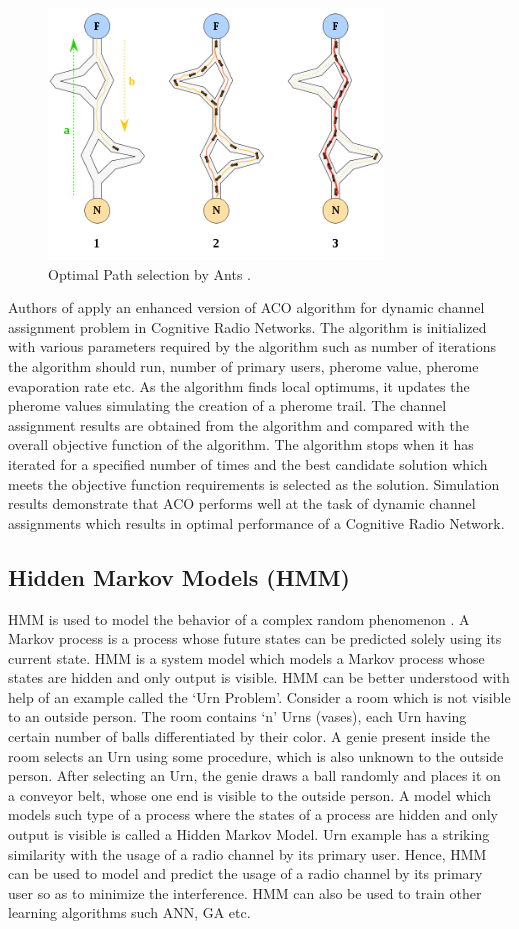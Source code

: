 \documentclass[conference]{IEEEtran}
\begin{document}
\begin{figure}[!t]
\centering
\includegraphics[width=3.5in]{Figure_5}
\caption{Optimal Path selection by Ants \cite{24}.}
\label{fig_aco}
\end{figure}

    Authors of \cite{13} apply an enhanced version of ACO algorithm  for dynamic channel assignment problem in Cognitive Radio Networks. The algorithm is initialized with various parameters required by the algorithm such as number of iterations the algorithm should run, number of primary users, pherome value, pherome evaporation rate etc. As the algorithm finds local optimums, it updates the pherome values simulating the creation of a pherome trail. The channel assignment results are obtained from the algorithm and compared with the overall objective function of the algorithm. The algorithm stops when it has iterated for a specified number of times and the best candidate solution which meets the objective function requirements is selected as the solution. Simulation results demonstrate that ACO performs well at the task of dynamic channel assignments which results in optimal performance of a Cognitive Radio Network.

\subsection{Hidden Markov Models (HMM)}
    HMM is used to model the behavior of a complex random phenomenon \cite{5}. A Markov process is a process whose future states can be predicted solely using its current state. HMM is a system model which models a Markov process whose states are hidden and only output is visible. HMM can be better understood with help of an example called the `Urn Problem'. Consider a room which is not visible to an outside person. The room contains `n' Urns (vases), each Urn having certain number of balls differentiated by their color. A genie present inside the room selects an Urn using some procedure, which is also unknown to the outside person. After selecting an Urn, the genie draws a ball randomly and places it on a conveyor belt, whose one end is visible to the outside person. A model which models such type of a process where the states of a process are hidden and only output is visible is called a Hidden Markov Model. Urn example has a striking similarity with the usage of a radio channel by its primary user. Hence, HMM can be used to model and predict the usage of a radio channel by its primary user so as to minimize the interference. HMM can also be used to train other learning algorithms such ANN, GA etc.
\end{document}
